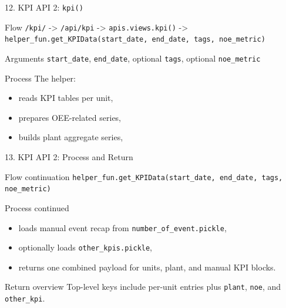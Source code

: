 \documentclass[aspectratio=169]{beamer}
\begin{document}
\begin{frame}{12. KPI API 2: \texttt{kpi()}}
\justifying
\begin{block}{Flow}
\texttt{/kpi/} -> \texttt{/api/kpi} ->
\texttt{apis.views.kpi()} ->
\texttt{helper\_fun.get\_KPIData(start\_date, end\_date, tags, noe\_metric)}
\end{block}

\begin{block}{Arguments}
\texttt{start\_date}, \texttt{end\_date}, optional \texttt{tags}, optional \texttt{noe\_metric}
\end{block}

\begin{block}{Process}
The helper:
\begin{itemize}
    \item reads KPI tables per unit,
    \item prepares OEE-related series,
    \item builds plant aggregate series,
\end{itemize}
\end{block}
\end{frame}

\begin{frame}{13. KPI API 2: Process and Return}
\justifying
\begin{block}{Flow continuation}
\texttt{helper\_fun.get\_KPIData(start\_date, end\_date, tags, noe\_metric)}
\end{block}

\begin{block}{Process continued}
\begin{itemize}
    \item loads manual event recap from \texttt{number\_of\_event.pickle},
    \item optionally loads \texttt{other\_kpis.pickle},
    \item returns one combined payload for units, plant, and manual KPI blocks.
\end{itemize}
\end{block}

\begin{block}{Return overview}
Top-level keys include per-unit entries plus \texttt{plant}, \texttt{noe}, and \texttt{other\_kpi}.
\end{block}
\end{frame}
\end{document}
